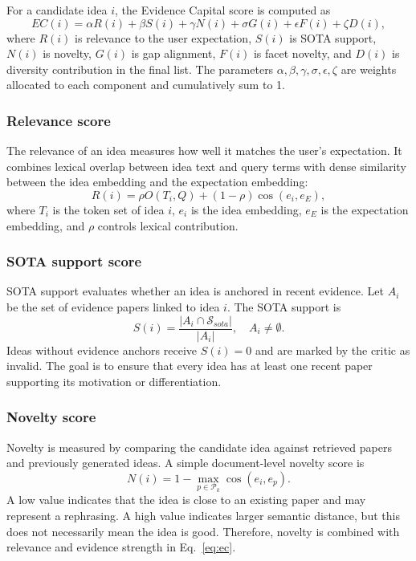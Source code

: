\documentclass[preprint,12pt]{elsarticle}
\begin{document}
For a candidate idea $i$, the Evidence Capital score is computed as
\begin{equation}
  EC(i) = \alpha R(i) + \beta S(i) + \gamma N(i) + \sigma G(i) + \epsilon F(i) + \zeta D(i),
  \label{eq:ec}
\end{equation}
where $R(i)$ is relevance to the user expectation, $S(i)$ is SOTA support, $N(i)$ is novelty, $G(i)$ is gap alignment, $F(i)$ is facet novelty, and $D(i)$ is diversity contribution in the final list. The parameters $\alpha,\beta,\gamma,\sigma,\epsilon,\zeta$ are weights allocated to each component and cumulatively sum to 1.

\subsubsection{Relevance score}

The relevance of an idea measures how well it matches the user's expectation. It combines lexical overlap between idea text and query terms with dense similarity between the idea embedding and the expectation embedding:
\begin{equation}
  R(i) = \rho O(T_i,Q) + (1-\rho)\cos(e_i,e_E),
\end{equation}
where $T_i$ is the token set of idea $i$, $e_i$ is the idea embedding, $e_E$ is the expectation embedding, and $\rho$ controls lexical contribution.

\subsubsection{SOTA support score}

SOTA support evaluates whether an idea is anchored in recent evidence. Let $A_i$ be the set of evidence papers linked to idea $i$. The SOTA support is
\begin{equation}
  S(i) = \frac{|A_i \cap \mathcal{S}_{sota}|}{|A_i|}, \quad A_i \neq \emptyset.
\end{equation}
Ideas without evidence anchors receive $S(i)=0$ and are marked by the critic as invalid. The goal is to ensure that every idea has at least one recent paper supporting its motivation or differentiation.

\subsubsection{Novelty score}

Novelty is measured by comparing the candidate idea against retrieved papers and previously generated ideas. A simple document-level novelty score is
\begin{equation}
  N(i) = 1 - \max_{p \in \mathcal{P}_k}\cos(e_i,e_p).
\end{equation}
A low value indicates that the idea is close to an existing paper and may represent a rephrasing. A high value indicates larger semantic distance, but this does not necessarily mean the idea is good. Therefore, novelty is combined with relevance and evidence strength in Eq.~\eqref{eq:ec}.
\end{document}
